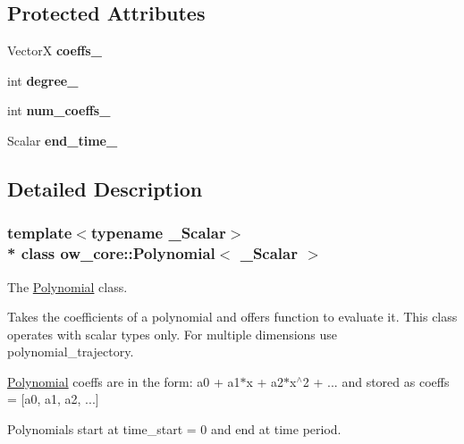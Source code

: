 \subsection*{Protected Attributes}
\begin{DoxyCompactItemize}
\item 
VectorX {\bfseries coeffs\+\_\+}\hypertarget{classow__core_1_1Polynomial_a44de5b63d53b31c58fcb0cffc0e44884}{}\label{classow__core_1_1Polynomial_a44de5b63d53b31c58fcb0cffc0e44884}

\item 
int {\bfseries degree\+\_\+}\hypertarget{classow__core_1_1Polynomial_aee790309d4c74fe5a64d5e9c9aa2ce7e}{}\label{classow__core_1_1Polynomial_aee790309d4c74fe5a64d5e9c9aa2ce7e}

\item 
int {\bfseries num\+\_\+coeffs\+\_\+}\hypertarget{classow__core_1_1Polynomial_a6e0bd65bcbda231cf85c24f1affd97f8}{}\label{classow__core_1_1Polynomial_a6e0bd65bcbda231cf85c24f1affd97f8}

\item 
Scalar {\bfseries end\+\_\+time\+\_\+}\hypertarget{classow__core_1_1Polynomial_a4e0beb00f291320c2afdf62614748097}{}\label{classow__core_1_1Polynomial_a4e0beb00f291320c2afdf62614748097}

\end{DoxyCompactItemize}


\subsection{Detailed Description}
\subsubsection*{template$<$typename \+\_\+\+Scalar$>$\\*
class ow\+\_\+core\+::\+Polynomial$<$ \+\_\+\+Scalar $>$}

The \hyperlink{classow__core_1_1Polynomial}{Polynomial} class. 

Takes the coefficients of a polynomial and offers function to evaluate it. This class operates with scalar types only. For multiple dimensions use polynomial\+\_\+trajectory.

\hyperlink{classow__core_1_1Polynomial}{Polynomial} coeffs are in the form\+: a0 + a1$\ast$x + a2$\ast$x$^\wedge$2 + ... and stored as coeffs = \mbox{[}a0, a1, a2, ...\mbox{]}

Polynomials start at time\+\_\+start = 0 and end at time period. 

